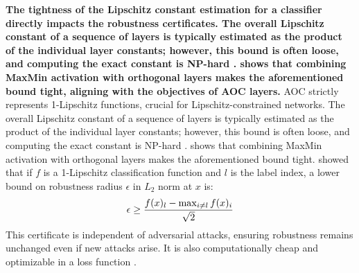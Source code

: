 \textbf{The tightness of the Lipschitz constant estimation for a classifier directly impacts the robustness certificates. The overall Lipschitz constant of a sequence of layers is typically estimated as the product of the individual layer constants; however, this bound is often loose, and computing the exact constant is NP-hard \cite{virmaux2018lipschitz}. \cite{anil_sorting_2019} shows that combining MaxMin activation with orthogonal layers makes the aforementioned bound tight, aligning with the objectives of AOC layers.
}
\fi
AOC strictly represents 1-Lipschitz functions, crucial for Lipschitz-constrained networks.
The overall Lipschitz constant of a sequence of layers is typically estimated as the product of the individual layer constants; however, this bound is often loose, and computing the exact constant is NP-hard \cite{virmaux2018lipschitz}. \cite{anil_sorting_2019} 
shows that combining MaxMin activation with orthogonal layers makes the aforementioned bound tight. \cite{bartlett2017spectrally} showed that if $f$ is a 1-Lipschitz classification function and $l$ is the label index, a lower bound on robustness radius $ \epsilon$ in $L_2$ norm at $x$ is:
\vspace{-1.5mm}
\[
    \epsilon \geq \frac{f(x)_l - \max_{i \neq l}f(x)_i}{\sqrt{2}}
    \vspace{-2mm}
\]
This certificate is independent of adversarial attacks, ensuring robustness remains unchanged even if new attacks arise. It is also computationally cheap and optimizable in a loss function \cite{singla_improved_2022, hu_recipe_2023}.

